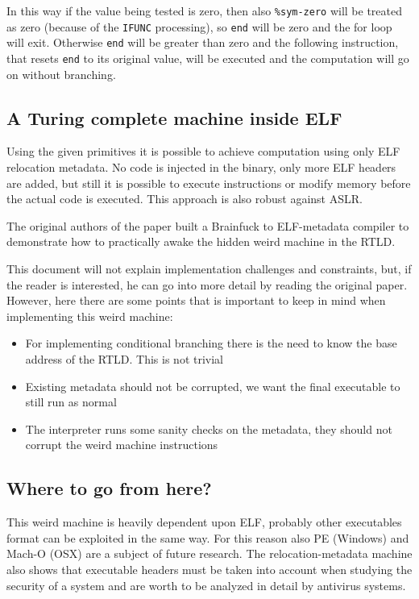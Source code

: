 \documentclass[11pt,twoside,a4paper]{article}
\begin{document}
In this way if the value being tested is zero, then also \texttt{\%sym-zero} will be treated as zero (because of the \texttt{IFUNC} processing), so \texttt{end} will be zero and the for loop will exit. Otherwise \texttt{end} will be greater than zero and the following instruction, that resets \texttt{end} to its original value, will be executed and the computation will go on without branching.


\subsection{A Turing complete machine inside ELF}

Using the given primitives it is possible to achieve computation using only ELF relocation metadata. No code is injected in the binary, only more ELF headers are added, but still it is possible to execute instructions or modify memory before the actual code is executed. This approach is also robust against ASLR.

The original authors of the paper built a Brainfuck to ELF-metadata compiler to demonstrate how to practically awake the hidden weird machine in the RTLD.

This document will not explain implementation challenges and constraints, but, if the reader is interested, he can go into more detail by reading the original paper. However, here there are some points that is important to keep in mind when implementing this weird machine:
\begin{itemize}
\item For implementing conditional branching there is the need to know the base address of the RTLD. This is not trivial
\item Existing metadata should not be corrupted, we want the final executable to still run as normal
\item The interpreter runs some sanity checks on the metadata, they should not corrupt the weird machine instructions
\end{itemize}


\subsection{Where to go from here?}
This weird machine is heavily dependent upon ELF, probably other executables format can be exploited in the same way. For this reason also PE (Windows) and Mach-O (OSX) are a subject of future research.
The relocation-metadata machine also shows that executable headers must be taken into account when studying the security of a system and are worth to be analyzed in detail by antivirus systems.
\end{document}
